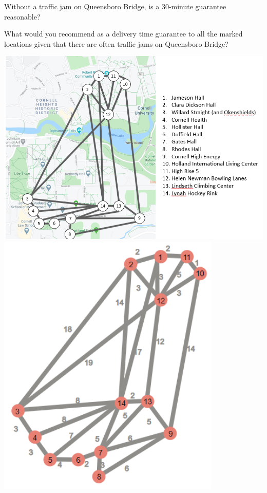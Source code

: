 \documentclass[twoside]{article}%
\begin{document}
\vskip 0.9in

\noindent
Without a traffic jam on Queensboro Bridge, is a 30-minute guarantee reasonable?

\vskip 0.9in

\noindent
What would you recommend as a delivery time guarantee to all the marked locations given that there are often traffic jams on Queensboro Bridge?

\vskip 0.9in

\newpage
\clearpage

\newpage
\includegraphics[angle=90,width=\textwidth]{campusmap.png}
\newpage
\includegraphics[width=0.8\textwidth]{Graph.png}
\newpage
\end{document}
